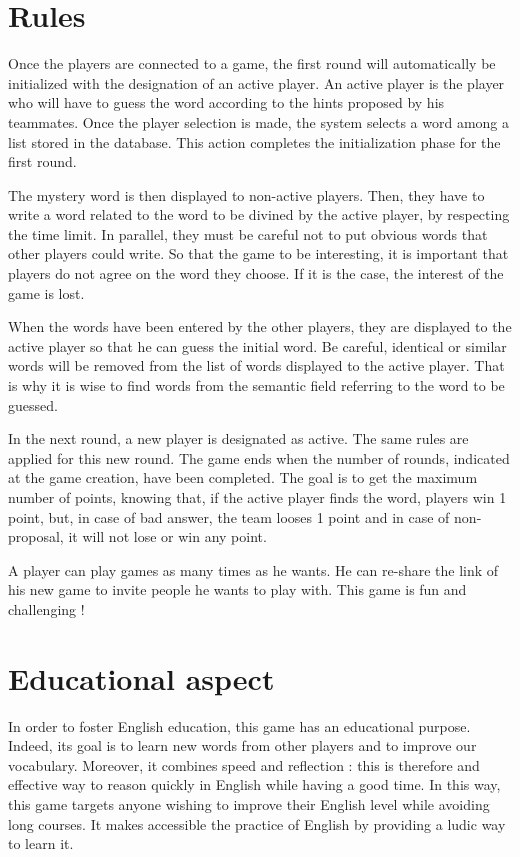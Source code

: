 \documentclass{tnreport}
\begin{document}
\clearpage

\section{Rules}

Once the players are connected to a game, the first round will automatically be initialized with the designation of an active player. An active player is the player who will have to guess the word according to the hints proposed by his teammates. Once the player selection is made, the system selects a word among a list stored in the database. This action completes the initialization phase for the first round. 

The mystery word is then displayed to non-active players. Then, they have to write a word related to the word to be divined by the active player, by respecting the time limit. In parallel, they must be careful not to put obvious words that other players could write. So that the game to be interesting, it is important that players do not agree on the word they choose. If it is the case, the interest of the game is lost. 

When the words have been entered by the other players, they are displayed to the active player so that he can guess the initial word. Be careful, identical or similar words will be removed from the list of words displayed to the active player. That is why it is wise to find words from the semantic field referring to the word to be guessed. 

In the next round, a new player is designated as active. The same rules are applied for this new round. The game ends when the number of rounds, indicated at the game creation, have been completed. The goal is to get the maximum number of points, knowing that, if the active player finds the word, players win 1 point, but, in case of bad answer, the team looses 1 point and in case of non-proposal, it will not lose or win any point. 

A player can play games as many times as he wants. He can re-share the link of his new game to invite people he wants to play with. This game is fun and challenging !

\section{Educational aspect}

In order to foster English education, this game has an educational purpose. Indeed, its goal is to learn new words from other players and to improve our vocabulary. Moreover, it combines speed and reflection : this is therefore and effective way to reason quickly in English while having a good time. In this way, this game targets anyone wishing to improve their English level while avoiding long courses. It makes accessible the practice of English by providing a ludic way to learn it. 
\end{document}
